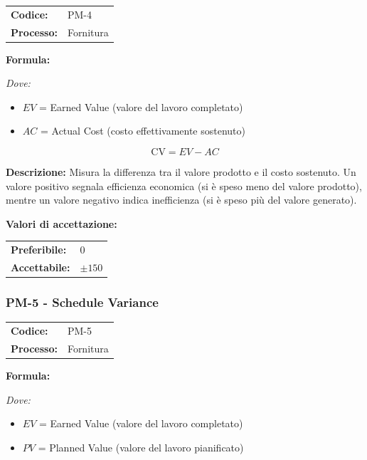 \documentclass[a4paper,11pt,oneside]{scrartcl}
\begin{document}
\noindent
\begin{tabular}{@{}p{}p{}@{}}
\textbf{Codice:} & PM-4 \\
\textbf{Processo:} & Fornitura \\
\end{tabular}

\vspace{0.3cm}
\noindent\textbf{Formula:}

\noindent\textit{Dove:}
\begin{itemize}[leftmargin=1.5cm, topsep=0pt, itemsep=0pt]
    \item $EV$ = Earned Value (valore del lavoro completato)
    \item $AC$ = Actual Cost (costo effettivamente sostenuto)
\end{itemize}

\[
\text{CV} = EV - AC
\]

\noindent\textbf{Descrizione:} Misura la differenza tra il valore prodotto e il costo sostenuto. Un valore positivo segnala efficienza economica (si è speso meno del valore prodotto), mentre un valore negativo indica inefficienza (si è speso più del valore generato).

\vspace{0.2cm}
\noindent\textbf{Valori di accettazione:}
\vspace{0.1cm}

\noindent
\begin{tabular}{@{}ll@{}}
\textbf{Preferibile:} & $0$ \\
\textbf{Accettabile:} & $\pm 150$ \\
\end{tabular}

\subsubsection{PM-5 - Schedule Variance}

\noindent
\begin{tabular}{@{}p{}p{}@{}}
\textbf{Codice:} & PM-5 \\
\textbf{Processo:} & Fornitura \\
\end{tabular}

\vspace{0.3cm}
\noindent\textbf{Formula:}

\noindent\textit{Dove:}
\begin{itemize}[leftmargin=1.5cm, topsep=0pt, itemsep=0pt]
    \item $EV$ = Earned Value (valore del lavoro completato)
    \item $PV$ = Planned Value (valore del lavoro pianificato)
\end{itemize}
\end{document}

